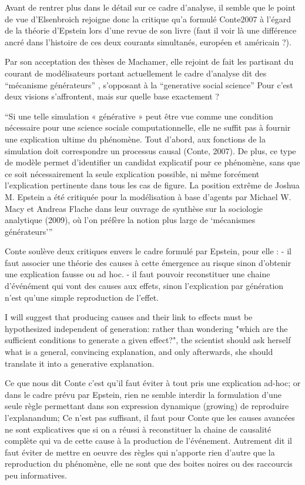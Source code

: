 Avant de rentrer plus dans le détail sur ce cadre d'analyse, il semble que le point de vue d'Elsenbroich rejoigne donc la critique qu'a formulé Conte2007 à l'égard de la théorie d'Epstein lors d'une revue de son livre \autocite{Epstein2007} (faut il voir là une différence ancré dans l'histoire de ces deux courants simultanés, européen et américain ?). 

Par son acceptation des thèses de Machamer, elle rejoint de fait les partisant du courant de modélisateurs portant actuellement le cadre d'analyse dit des \enquote{mécanisme générateurs} \autocites{Hedstrom2010, Conte2007, Manzo2007}, s'opposant à la  \enquote{generative social science} \autocite{Epstein1999}  Pour \textcite[698]{Livet2014} c'est deux visions s'affrontent, mais sur quelle base exactement ? 

\enquote{Si une telle simulation « générative » peut être vue comme une condition nécessaire pour une science sociale computationnelle, elle ne suffit pas à fournir une explication ultime du phénomène. Tout d’abord, aux fonctions de la simulation doit correspondre un processus causal (Conte, 2007). De plus, ce type de modèle permet d’identifier un candidat explicatif pour ce phénomène, sans que ce soit nécessairement la seule explication possible, ni même forcément l’explication pertinente dans tous les cas de figure. La position extrême de Joshua M. Epstein a été critiquée pour la modélisation à base d’agents par Michael W. Macy et Andreas Flache dans leur ouvrage de synthèse sur la sociologie analytique (2009), où l’on préfère la notion plus large de \enquote{mécanismes générateurs}} \autocite{Livet2014}


Conte soulève deux critiques envers le cadre formulé par Epstein, pour elle : 
- il faut associer une théorie des causes à cette émergence au risque sinon d'obtenir une explication fausse ou ad hoc.
- il faut pouvoir reconstituer une chaine d'événément qui vont des causes aux effets, sinon l'explication par génération n'est qu'une simple reproduction de l'effet.


I will suggest that producing causes
and their link to effects must be hypothesized independent of generation: rather than wondering "which are the sufficient conditions to
generate a given effect?", the scientist should ask herself what is a general, convincing explanation, and only afterwards, she should
translate it into a generative explanation.

Ce que nous dit Conte c'est qu'il faut éviter à tout pris une explication ad-hoc; or dans le cadre prévu par Epstein, rien ne semble interdir la formulation d'une seule règle permettant dans son expression dynamique (growing) de reproduire l'explanandum; Ce n'est pas suffisant, il faut pour Conte que les causes avancées ne sont explicatives que si on a réussi à reconstituer la chaine de causalité complète qui va de cette cause à la production de l'événement. Autrement dit il faut éviter de mettre en oeuvre des règles qui n'apporte rien d'autre que la reproduction du phénomène, elle ne sont que des boites noires ou des raccourcis peu informatives.

